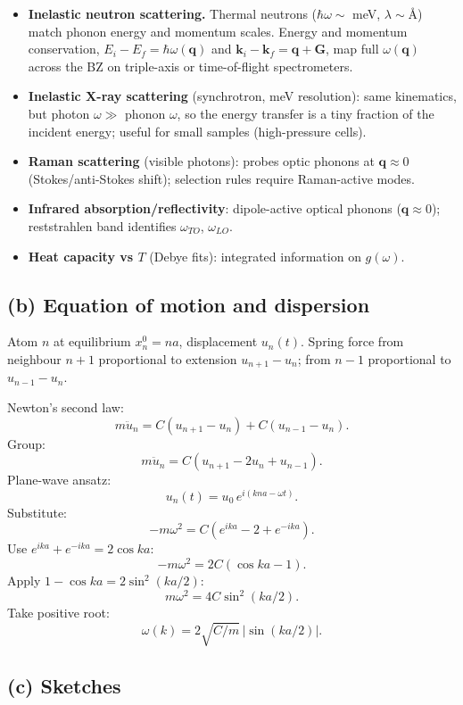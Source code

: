 \documentclass[11pt]{article}
\begin{document}
\begin{itemize}
\item \textbf{Inelastic neutron scattering.} Thermal neutrons ($\hbar\omega\sim$ meV, $\lambda\sim$\AA) match phonon energy and momentum scales. Energy and momentum conservation, $E_i-E_f = \hbar\omega(\bm q)$ and $\bm k_i - \bm k_f = \bm q + \bm G$, map full $\omega(\bm q)$ across the BZ on triple-axis or time-of-flight spectrometers.
\item \textbf{Inelastic X-ray scattering} (synchrotron, meV resolution): same kinematics, but photon $\omega\gg$ phonon $\omega$, so the energy transfer is a tiny fraction of the incident energy; useful for small samples (high-pressure cells).
\item \textbf{Raman scattering} (visible photons): probes optic phonons at $\bm q\approx 0$ (Stokes/anti-Stokes shift); selection rules require Raman-active modes.
\item \textbf{Infrared absorption/reflectivity}: dipole-active optical phonons ($\bm q\approx 0$); reststrahlen band identifies $\omega_{TO}$, $\omega_{LO}$.
\item \textbf{Heat capacity vs $T$} (Debye fits): integrated information on $g(\omega)$.
\end{itemize}

\subsection*{(b) Equation of motion and dispersion}

Atom $n$ at equilibrium $x_n^0 = na$, displacement $u_n(t)$. Spring force from neighbour $n+1$ proportional to extension $u_{n+1}-u_n$; from $n-1$ proportional to $u_{n-1}-u_n$.

Newton's second law:
\[
m\ddot u_n = C(u_{n+1}-u_n) + C(u_{n-1}-u_n).
\]
Group:
\[
m\ddot u_n = C(u_{n+1} - 2u_n + u_{n-1}).
\]
Plane-wave ansatz:
\[
u_n(t) = u_0\,e^{i(kna - \omega t)}.
\]
Substitute:
\[
-m\omega^2 = C(e^{ika} - 2 + e^{-ika}).
\]
Use $e^{ika}+e^{-ika} = 2\cos ka$:
\[
-m\omega^2 = 2C(\cos ka - 1).
\]
Apply $1-\cos ka = 2\sin^2(ka/2)$:
\[
m\omega^2 = 4C\sin^2(ka/2).
\]
Take positive root:
\begin{equation}
\boxed{\;\omega(k) = 2\sqrt{C/m}\,|\!\sin(ka/2)|.\;}
\label{eq:disp}
\end{equation}

\subsection*{(c) Sketches}
\end{document}

